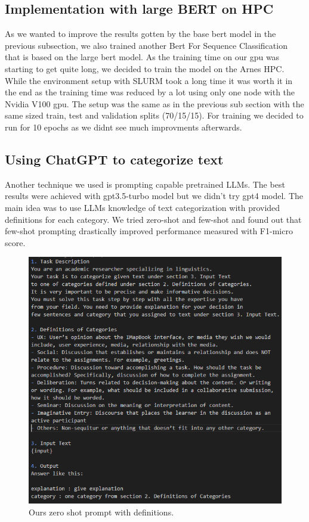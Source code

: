 \documentclass[fleqn,moreauthors,10pt]{ds_report}
\begin{document}
\subsection*{Implementation with large BERT on HPC}

As we wanted to improve the results gotten by the base bert model in the previous subsection, we also trained another Bert For Sequence Classification that is based on the large bert model. As the training time on our gpu was starting to get quite long, we decided to train the model on the Arnes HPC. While the environment setup with SLURM took a long time it was worth it in the end as the training time was reduced by a lot using only one node with the Nvidia V100 gpu. The setup was the same as in the previous sub section with the same sized train, test and validation splits (70/15/15). For training we decided to run for 10 epochs as we didnt see much improvments afterwards. \cite{sling}

\subsection*{Using ChatGPT to categorize text}
Another technique we used is prompting capable pretrained LLMs. The best results were achieved with gpt3.5-turbo model but we didn't try gpt4 model. The main idea was to use LLMs knowledge of text categorization with provided definitions for each category. We tried zero-shot and few-shot and found out that few-shot prompting drastically improved performance measured with F1-micro score.


\begin{figure}[ht]\centering
	\includegraphics[width=\linewidth]{report/fig/zero-shot-prompt.png}
        \caption{Ours zero shot prompt with definitions.}
        \label{fig:zeroshot}
\end{figure}
\end{document}
